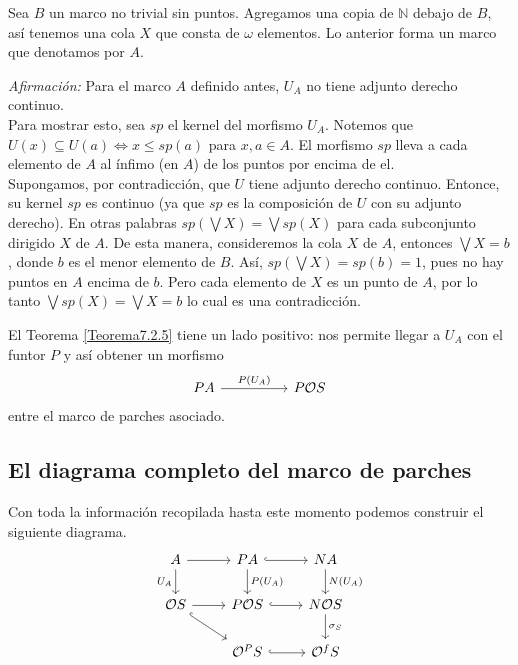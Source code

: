 \begin{ej}\label{Ejemplo7.2.7}
    Sea $B$ un marco no trivial sin puntos. Agregamos una copia de $\mathbb{N}$ debajo de $B$, así tenemos una cola $X$ que consta de $\omega$ elementos. Lo anterior forma un marco que denotamos por $A$. 

    \noindent
    \emph{Afirmación:} Para el marco $A$ definido antes, $U_A$ no tiene adjunto derecho continuo.\\

    Para mostrar esto, sea $sp$ el kernel del morfismo $U_A$. Notemos que $U(x)\subseteq U(a)\Leftrightarrow x\leq sp(a)$ para $x, a\in A$. El morfismo $sp$ lleva a cada elemento de $A$ al ínfimo (en $A$) de los puntos por encima de el.\\

    Supongamos, por contradicción, que $U$ tiene adjunto derecho continuo. Entonce, su kernel $sp$ es continuo (ya que $sp$ es la composición de $U$ con su adjunto derecho). En otras palabras $sp(\bigvee X)=\bigvee sp(X)$ para cada subconjunto dirigido $X$ de $A$. De esta manera, consideremos la cola $X$ de $A$, entonces $\bigvee X=b$, donde $b$ es el menor elemento de $B$. Así, $sp(\bigvee X)=sp(b)=1$, pues no hay puntos en $A$ encima de $b$. Pero cada elemento de $X$ es un punto de $A$, por lo tanto $\bigvee sp(X)=\bigvee X=b$ lo cual es una contradicción.
\end{ej}

El Teorema \ref{Teorema7.2.5} tiene un lado positivo: nos permite llegar a $U_A$ con el funtor $P$ y así obtener un morfismo 
\[\begin{tikzcd}
	PA && {P\mathcal{O}S}
	\arrow["{P(U_A)}", from=1-1, to=1-3]
\end{tikzcd}\]
entre el marco de parches asociado.

\subsection{El diagrama completo del marco de parches}

Con toda la información recopilada hasta este momento podemos construir el siguiente diagrama.
\[\begin{tikzcd}
	A & PA & NA \\
	{\mathcal{O}S} & {P\mathcal{O}S} & {N\mathcal{O}S} \\
	& {\mathcal{O}^PS} & {\mathcal{O}^fS}
	\arrow[from=1-1, to=1-2]
	\arrow["{U_A}"', from=1-1, to=2-1]
	\arrow[hook, from=1-2, to=1-3]
	\arrow["{P(U_A)}", from=1-2, to=2-2]
	\arrow["{N(U_A)}", from=1-3, to=2-3]
	\arrow[from=2-1, to=2-2]
	\arrow[hook, from=2-1, to=3-2]
	\arrow[hook, from=2-2, to=2-3]
	\arrow["{\sigma_S}", from=2-3, to=3-3]
	\arrow[hook, from=3-2, to=3-3]
\end{tikzcd}\]

